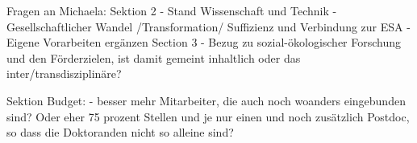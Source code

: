 Fragen an Michaela:
Sektion 2
- Stand Wissenschaft und Technik - Gesellschaftlicher Wandel /Transformation/ Suffizienz und Verbindung zur ESA
- Eigene Vorarbeiten ergänzen
Section 3
- Bezug zu sozial-ökologischer Forschung und den Förderzielen, ist damit gemeint inhaltlich oder das inter/transdisziplinäre?

Sektion Budget:
- besser mehr Mitarbeiter, die auch noch woanders eingebunden sind? Oder eher 75 prozent Stellen und je nur einen und noch zusätzlich Postdoc, so dass die Doktoranden nicht so alleine sind?